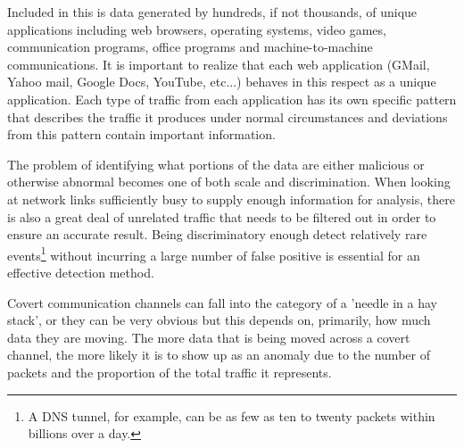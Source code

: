 \documentclass{article}
\theoremstyle{remark}
\theoremstyle{definition}
\theoremstyle{definition}
\theoremstyle{definition}
\begin{document}
Included in this is data generated by hundreds, if not thousands, of unique applications including web browsers, operating systems, video games, communication programs, office programs and machine-to-machine communications. It is important to realize that each web application (GMail, Yahoo mail, Google Docs, YouTube, etc...) behaves in this respect as a unique application. Each type of traffic from each application has its own specific pattern that describes the traffic it produces under normal circumstances and deviations from this pattern contain important information.

The problem of identifying what portions of the data are either malicious or otherwise abnormal becomes one of both scale and discrimination. When looking at network links sufficiently busy to supply enough information for analysis, there is also a great deal of unrelated traffic that needs to be filtered out in order to ensure an accurate result. Being discriminatory enough detect relatively rare events\footnote{A DNS tunnel, for example, can be as few as ten to twenty packets within billions over a day.} without incurring a large number of false positive is essential for an effective detection method.

Covert communication channels can fall into the category of a 'needle in a hay stack', or they can be very obvious but this depends on, primarily, how much data they are moving. The more data that is being moved across a covert channel, the more likely it is to show up as an anomaly due to the number of packets and the proportion of the total traffic it represents.



% 
\end{document}
